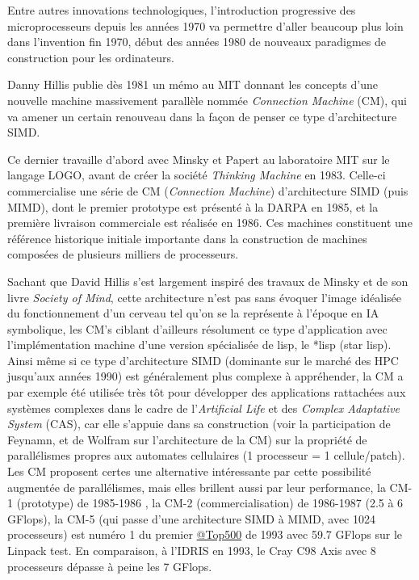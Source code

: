 
Entre autres innovations technologiques, l'introduction progressive des microprocesseurs depuis les années 1970 va permettre d'aller beaucoup plus loin dans l'invention fin 1970, début des années 1980 de nouveaux paradigmes de construction pour les ordinateurs. %

Danny Hillis publie dès 1981 un mémo au MIT donnant les concepts \autocite{Hillis1981} d'une nouvelle machine massivement parallèle nommée \textit{Connection Machine} (CM), qui va amener un certain renouveau dans la façon de penser ce type d'architecture SIMD.

Ce dernier travaille d'abord avec Minsky et Papert au laboratoire MIT sur le langage LOGO, avant de créer la société \textit{Thinking Machine} en 1983. Celle-ci commercialise une série de CM (\textit{Connection Machine}) d’architecture SIMD (puis MIMD), dont le premier prototype est présenté à la DARPA en 1985, et la première livraison commerciale est réalisée en 1986. Ces machines constituent une référence historique initiale importante dans la construction de machines composées de plusieurs milliers de processeurs.

Sachant que David Hillis s'est largement inspiré des travaux de Minsky et de son livre \textit{Society of Mind}, cette architecture n'est pas sans évoquer l'image idéalisée du fonctionnement d'un cerveau tel qu'on se la représente à l'époque en IA symbolique, les CM's ciblant d'ailleurs résolument ce type d'application avec l'implémentation machine d'une version spécialisée de lisp, le *lisp (star lisp). Ainsi même si ce type d’architecture SIMD (dominante sur le marché des HPC jusqu’aux années 1990) est généralement plus complexe à appréhender, la CM a par exemple été utilisée très tôt pour développer des applications rattachées aux systèmes complexes dans le cadre de l’\textit{Artificial Life} et des \textit{Complex Adaptative System} (CAS), car elle s’appuie dans sa construction (voir la participation de Feynamn, et de Wolfram sur l'architecture de la CM) sur la propriété de parallélismes propres aux automates cellulaires (1 processeur = 1 cellule/patch). Les CM proposent certes une alternative intéressante par cette possibilité augmentée de parallélismes, mais elles brillent aussi par leur performance, la CM-1 (prototype) de 1985-1986 , la CM-2 (commercialisation) de 1986-1987 (2.5 à 6 GFlops), la CM-5 (qui passe d'une architecture SIMD à MIMD, avec 1024 processeurs) est numéro 1 du premier \href{http://www.top500.org/featured/systems/cm-5-los-alamos-national-lab/}{@Top500} de 1993 avec 59.7 GFlops sur le Linpack test. En comparaison, à l'IDRIS en 1993, le Cray C98 Axis avec 8 processeurs dépasse à peine les 7 GFlops.

